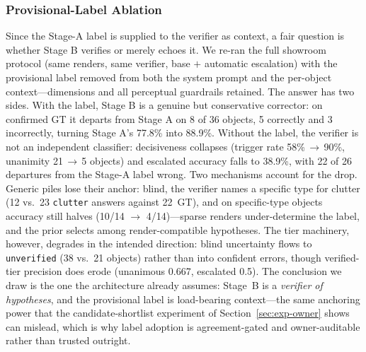 \documentclass[electronics,article,accept,pdftex,moreauthors]{Definitions/mdpi}
\begin{document}
\subsubsection{Provisional-Label Ablation}
Since the Stage-A label is supplied to the verifier as context, a fair
question is whether Stage B verifies or merely echoes it. We re-ran the
full showroom protocol (same renders, same verifier, base $+$ automatic
escalation) with the provisional label removed from both the system
prompt and the per-object context---dimensions and all perceptual
guardrails retained. The answer has two sides. With the label, Stage B
is a genuine but conservative corrector: on confirmed GT it departs from
Stage A on 8 of 36 objects, 5 correctly and 3 incorrectly, turning
Stage A's 77.8\% into 88.9\%. Without the label, the verifier is not an
independent classifier: decisiveness collapses (trigger rate
58\%\,$\rightarrow$\,90\%, unanimity 21\,$\rightarrow$\,5 objects) and
escalated accuracy falls to 38.9\%, with 22 of 26 departures from the
Stage-A label wrong. Two mechanisms account for the drop. Generic piles
lose their anchor: blind, the verifier names a specific type for
clutter (12 vs.\ 23 \texttt{clutter} answers against 22~GT), and on
specific-type objects accuracy still halves (10/14
$\rightarrow$ 4/14)---sparse renders under-determine the label, and the
prior selects among render-compatible hypotheses. The tier machinery,
however, degrades in the intended direction: blind uncertainty flows to
\texttt{unverified} (38 vs.\ 21 objects) rather than into confident
errors, though verified-tier precision does erode (unanimous 0.667,
escalated 0.5). The conclusion we draw is the one the architecture
already assumes: Stage~B is a \emph{verifier of hypotheses}, and the
provisional label is load-bearing context---the same anchoring power
that the candidate-shortlist experiment of Section~\ref{sec:exp-owner}
shows can mislead, which is why label adoption is agreement-gated and
owner-auditable rather than trusted outright.
\end{document}
